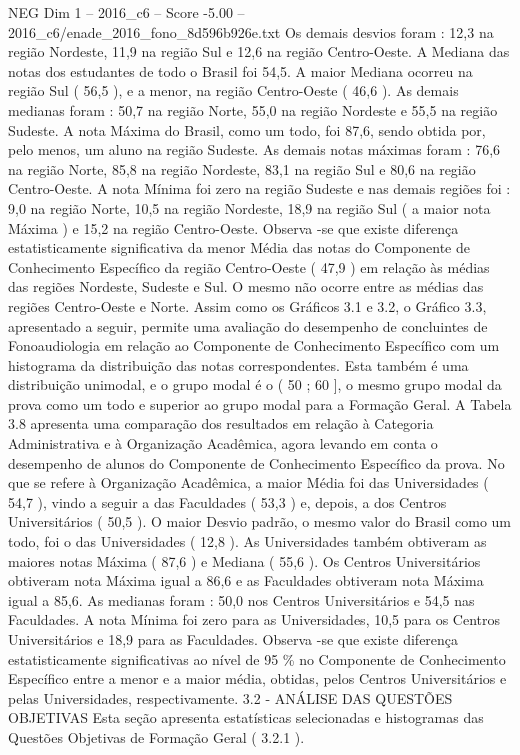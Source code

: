 \begin{textsample}{NEG Dim 1 – 2016\_c6 – Score -5.00 – 2016\_c6/enade\_2016\_fono\_8d596b926e.txt}
Os demais desvios foram : 12,3 na região Nordeste, 11,9 na região Sul e 12,6 na região Centro-Oeste.
A Mediana das notas dos estudantes de todo o Brasil foi 54,5.
A maior Mediana ocorreu na região Sul ( 56,5 ), e a menor, na região Centro-Oeste ( 46,6 ).
As demais medianas foram : 50,7 na região Norte, 55,0 na região Nordeste e 55,5 na região Sudeste.
A nota Máxima do Brasil, como um todo, foi 87,6, sendo obtida por, pelo menos, um aluno na região Sudeste.
As demais notas máximas foram : 76,6 na região Norte, 85,8 na região Nordeste, 83,1 na região Sul e 80,6 na região Centro-Oeste.
A nota Mínima foi zero na região Sudeste e nas demais regiões foi : 9,0 na região Norte, 10,5 na região Nordeste, 18,9 na região Sul ( a maior nota Máxima ) e 15,2 na região Centro-Oeste.
Observa -se que existe diferença estatisticamente significativa da menor Média das notas do Componente de Conhecimento Específico da região Centro-Oeste ( 47,9 ) em relação às médias das regiões Nordeste, Sudeste e Sul.
O mesmo não ocorre entre as médias das regiões Centro-Oeste e Norte.
Assim como os Gráficos 3.1 e 3.2, o Gráfico 3.3, apresentado a seguir, permite uma avaliação do desempenho de concluintes de Fonoaudiologia em relação ao Componente de Conhecimento Específico com um histograma da distribuição das notas correspondentes.
Esta também é uma distribuição unimodal, e o grupo modal é o ( 50 ; 60 ], o mesmo grupo modal da prova como um todo e superior ao grupo modal para a Formação Geral.
A Tabela 3.8 apresenta uma comparação dos resultados em relação à Categoria Administrativa e à Organização Acadêmica, agora levando em conta o desempenho de alunos do Componente de Conhecimento Específico da prova.
No que se refere à Organização Acadêmica, a maior Média foi das Universidades ( 54,7 ), vindo a seguir a das Faculdades ( 53,3 ) e, depois, a dos Centros Universitários ( 50,5 ).
O maior Desvio padrão, o mesmo valor do Brasil como um todo, foi o das Universidades ( 12,8 ).
As Universidades também obtiveram as maiores notas Máxima ( 87,6 ) e Mediana ( 55,6 ).
Os Centros Universitários obtiveram nota Máxima igual a 86,6 e as Faculdades obtiveram nota Máxima igual a 85,6.
As medianas foram : 50,0 nos Centros Universitários e 54,5 nas Faculdades.
A nota Mínima foi zero para as Universidades, 10,5 para os Centros Universitários e 18,9 para as Faculdades.
Observa -se que existe diferença estatisticamente significativas ao nível de 95 \% no Componente de Conhecimento Específico entre a menor e a maior média, obtidas, pelos Centros Universitários e pelas Universidades, respectivamente. 3.2 - ANÁLISE DAS QUESTÕES OBJETIVAS Esta seção apresenta estatísticas selecionadas e histogramas das Questões Objetivas de Formação Geral ( 3.2.1 ).

\end{textsample}
